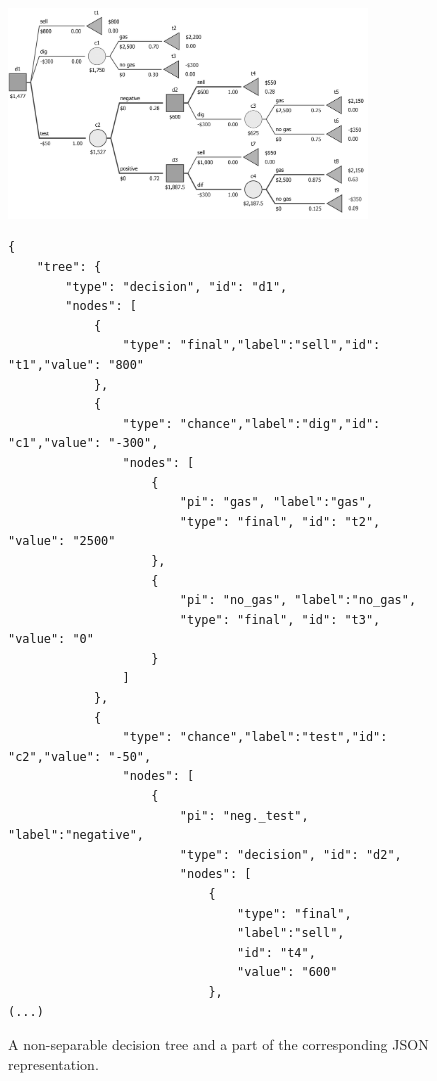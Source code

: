 \documentclass[a4paper,10pt,english]{sphinxmanual}
\begin{document}
	\begin{figure}
		\centering
		\includegraphics[width=0.85\textwidth]{gas.png}
\begin{lstlisting}[frame=single,label=lst:json2] 
{
    "tree": {
        "type": "decision", "id": "d1",
        "nodes": [
            {
                "type": "final","label":"sell","id": "t1","value": "800"
            }, 
            {
                "type": "chance","label":"dig","id": "c1","value": "-300",
                "nodes": [
                    {
                        "pi": "gas", "label":"gas",
                        "type": "final", "id": "t2", "value": "2500"
                    }, 
                    {
                        "pi": "no_gas", "label":"no_gas",
                        "type": "final", "id": "t3", "value": "0"
                    }
                ] 
            }, 
            {
                "type": "chance","label":"test","id": "c2","value": "-50",
                "nodes": [
                    {
                        "pi": "neg._test", "label":"negative",
                        "type": "decision", "id": "d2",
                        "nodes": [
                            {
                                "type": "final", 
                                "label":"sell",
                                "id": "t4", 
                                "value": "600"
                            }, 
(...)
\end{lstlisting}
		\caption{A non-separable decision tree and a part of the corresponding JSON representation.}
		\label{fig:json2}
\end{figure}


	
\end{document}
